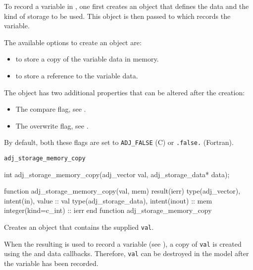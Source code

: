 
To record a variable in \libadjoint, one first creates an  object that defines the data and the kind of storage to be used.
This object is then passed to  which records the variable. 

The available options to create an  object are: 
\begin{itemize}
\item {} to store a copy of the variable data in memory.
\item {} to store a reference to the variable data.
\end{itemize}

The  object has two additional properties that can be altered after the creation:
\begin{itemize}
\item The compare flag, see .
\item The overwrite flag, see .
\end{itemize}
By default, both these flags are set to \texttt{ADJ_FALSE} (C) or \texttt{.false.} (Fortran).

\begin{boxwithtitle}{\texttt{adj_storage_memory_copy}}
\begin{minipage}{\columnwidth}
\begin{ccode}
  int adj_storage_memory_copy(adj_vector val, adj_storage_data* data);
\end{ccode}
\begin{fortrancode}
  function adj_storage_memory_copy(val, mem) result(ierr)
    type(adj_vector), intent(in), value :: val
    type(adj_storage_data), intent(inout) :: mem
    integer(kind=c_int) :: ierr
  end function adj_storage_memory_copy
\end{fortrancode}
\end{minipage}
\end{boxwithtitle}

Creates an  object that contains the supplied  \texttt{val}.

When the resulting  is used to record a variable (see ), 
a copy of \texttt{val} is created using the  and  data callbacks.
Therefore, \texttt{val} can be destroyed in the model after the variable has been recorded. 

